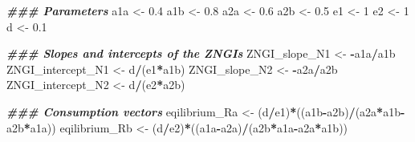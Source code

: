 \documentclass[
]{book}
\newenvironment{Shaded}{\begin{snugshade}}{\end{snugshade}}
\newcommand{\DecValTok}[1]{\textcolor[rgb]{0.00,0.00,0.81}{#1}}
\newcommand{\DocumentationTok}[1]{\textcolor[rgb]{0.56,0.35,0.01}{\textbf{\textit{#1}}}}
\newcommand{\FloatTok}[1]{\textcolor[rgb]{0.00,0.00,0.81}{#1}}
\newcommand{\NormalTok}[1]{#1}
\newcommand{\OtherTok}[1]{\textcolor[rgb]{0.56,0.35,0.01}{#1}}
\newcommand{\SpecialCharTok}[1]{\textcolor[rgb]{0.81,0.36,0.00}{\textbf{#1}}}
\begin{document}
\begin{Shaded}
\begin{Highlighting}[]
\DocumentationTok{\#\#\# Parameters}
\NormalTok{a1a }\OtherTok{\textless{}{-}} \FloatTok{0.4}
\NormalTok{a1b }\OtherTok{\textless{}{-}} \FloatTok{0.8}
\NormalTok{a2a }\OtherTok{\textless{}{-}} \FloatTok{0.6}
\NormalTok{a2b }\OtherTok{\textless{}{-}} \FloatTok{0.5}
\NormalTok{e1 }\OtherTok{\textless{}{-}} \DecValTok{1}
\NormalTok{e2 }\OtherTok{\textless{}{-}} \DecValTok{1}
\NormalTok{d }\OtherTok{\textless{}{-}} \FloatTok{0.1}

\DocumentationTok{\#\#\# Slopes and intercepts of the ZNGI\textquotesingle{}s}
\NormalTok{ZNGI\_slope\_N1 }\OtherTok{\textless{}{-}} \SpecialCharTok{{-}}\NormalTok{a1a}\SpecialCharTok{/}\NormalTok{a1b}
\NormalTok{ZNGI\_intercept\_N1 }\OtherTok{\textless{}{-}}\NormalTok{ d}\SpecialCharTok{/}\NormalTok{(e1}\SpecialCharTok{*}\NormalTok{a1b)  }
\NormalTok{ZNGI\_slope\_N2 }\OtherTok{\textless{}{-}} \SpecialCharTok{{-}}\NormalTok{a2a}\SpecialCharTok{/}\NormalTok{a2b}
\NormalTok{ZNGI\_intercept\_N2 }\OtherTok{\textless{}{-}}\NormalTok{ d}\SpecialCharTok{/}\NormalTok{(e2}\SpecialCharTok{*}\NormalTok{a2b)}

\DocumentationTok{\#\#\# Consumption vectors}
\NormalTok{eqilibrium\_Ra }\OtherTok{\textless{}{-}}\NormalTok{ (d}\SpecialCharTok{/}\NormalTok{e1)}\SpecialCharTok{*}\NormalTok{((a1b}\SpecialCharTok{{-}}\NormalTok{a2b)}\SpecialCharTok{/}\NormalTok{(a2a}\SpecialCharTok{*}\NormalTok{a1b}\SpecialCharTok{{-}}\NormalTok{a2b}\SpecialCharTok{*}\NormalTok{a1a))}
\NormalTok{eqilibrium\_Rb }\OtherTok{\textless{}{-}}\NormalTok{ (d}\SpecialCharTok{/}\NormalTok{e2)}\SpecialCharTok{*}\NormalTok{((a1a}\SpecialCharTok{{-}}\NormalTok{a2a)}\SpecialCharTok{/}\NormalTok{(a2b}\SpecialCharTok{*}\NormalTok{a1a}\SpecialCharTok{{-}}\NormalTok{a2a}\SpecialCharTok{*}\NormalTok{a1b))}


\end{Highlighting}
\end{Shaded}
\end{document}

